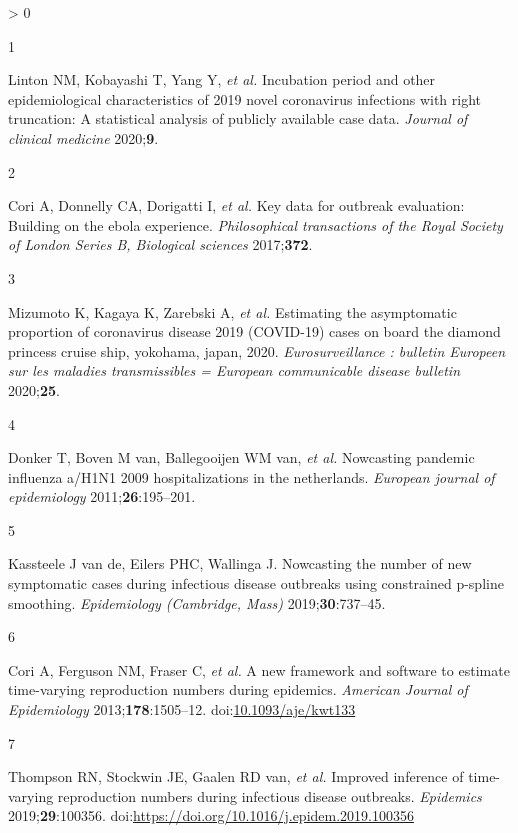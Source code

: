 \documentclass[
]{article}
\newlength{\cslhangindent}
\newlength{\csllabelwidth}
\newenvironment{CSLReferences}[2] %
 {%
  \setlength{\parindent}{0pt}
  \ifodd #1 \everypar{\setlength{\hangindent}{\cslhangindent}}\ignorespaces\fi
  \ifnum #2 > 0
  \setlength{\parskip}{#2\baselineskip}
  \fi
 }%
 {}
\newcommand{\CSLLeftMargin}[1]{\parbox[t]{\csllabelwidth}{#1}}
\newcommand{\CSLRightInline}[1]{\parbox[t]{\linewidth - \csllabelwidth}{#1}\break}
\begin{document}
\hypertarget{refs}{}
\begin{CSLReferences}{0}{0}
\leavevmode\hypertarget{ref-Linton:2020gg}{}%
\CSLLeftMargin{1 }
\CSLRightInline{Linton NM, Kobayashi T, Yang Y, \emph{et al.} Incubation
period and other epidemiological characteristics of 2019 novel
coronavirus infections with right truncation: A statistical analysis of
publicly available case data. \emph{Journal of clinical medicine}
2020;\textbf{9}.}

\leavevmode\hypertarget{ref-Cori:2017fg}{}%
\CSLLeftMargin{2 }
\CSLRightInline{Cori A, Donnelly CA, Dorigatti I, \emph{et al.} Key data
for outbreak evaluation: Building on the ebola experience.
\emph{Philosophical transactions of the Royal Society of London Series
B, Biological sciences} 2017;\textbf{372}.}

\leavevmode\hypertarget{ref-Mizumoto:2020ct}{}%
\CSLLeftMargin{3 }
\CSLRightInline{Mizumoto K, Kagaya K, Zarebski A, \emph{et al.}
Estimating the asymptomatic proportion of coronavirus disease 2019
(COVID-19) cases on board the diamond princess cruise ship, yokohama,
japan, 2020. \emph{Eurosurveillance : bulletin Europeen sur les maladies
transmissibles = European communicable disease bulletin}
2020;\textbf{25}.}

\leavevmode\hypertarget{ref-Donker:2011fk}{}%
\CSLLeftMargin{4 }
\CSLRightInline{Donker T, Boven M van, Ballegooijen WM van, \emph{et
al.} Nowcasting pandemic influenza a/H1N1 2009 hospitalizations in the
netherlands. \emph{European journal of epidemiology}
2011;\textbf{26}:195--201.}

\leavevmode\hypertarget{ref-vandeKassteele:2019cn}{}%
\CSLLeftMargin{5 }
\CSLRightInline{Kassteele J van de, Eilers PHC, Wallinga J. Nowcasting
the number of new symptomatic cases during infectious disease outbreaks
using constrained p-spline smoothing. \emph{Epidemiology (Cambridge,
Mass)} 2019;\textbf{30}:737--45.}

\leavevmode\hypertarget{ref-cori2013}{}%
\CSLLeftMargin{6 }
\CSLRightInline{Cori A, Ferguson NM, Fraser C, \emph{et al.} A new
framework and software to estimate time-varying reproduction numbers
during epidemics. \emph{American Journal of Epidemiology}
2013;\textbf{178}:1505--12.
doi:\href{https://doi.org/10.1093/aje/kwt133}{10.1093/aje/kwt133}}

\leavevmode\hypertarget{ref-THOMPSON2019100356}{}%
\CSLLeftMargin{7 }
\CSLRightInline{Thompson RN, Stockwin JE, Gaalen RD van, \emph{et al.}
Improved inference of time-varying reproduction numbers during
infectious disease outbreaks. \emph{Epidemics} 2019;\textbf{29}:100356.
doi:\url{https://doi.org/10.1016/j.epidem.2019.100356}}


\end{CSLReferences}
\end{document}
